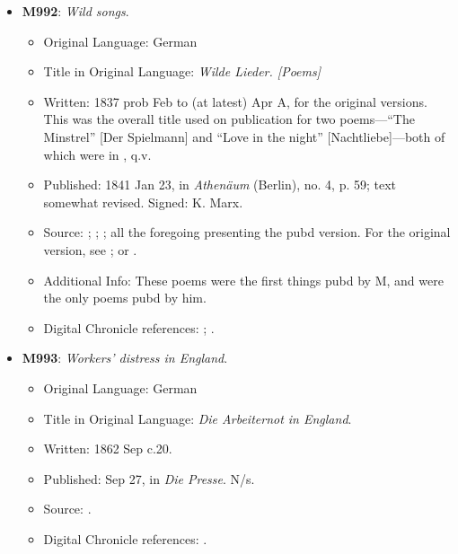 \begin{itemize}
    \item \textbf{M992}: \textit{Wild songs}.
    \begin{itemize}
        \item Original Language: German
        \item Title in Original Language: \textit{Wilde Lieder. [Poems]}
        \item Written: 1837 prob Feb to (at latest) Apr A, for the original versions. This was the overall title used on publication for two poems---``The Minstrel'' [Der Spielmann] and ``Love in the night'' [Nachtliebe]---both of which were in , q.v.
        \item Published: 1841 Jan 23, in \textit{Athenäum} (Berlin), no. 4, p. 59; text somewhat revised. Signed: K. Marx.
        \item Source: ; ; ; all the foregoing presenting the pubd version. For the original version, see ; or .
        \item Additional Info: These poems were the first things pubd by M, and were the only poems pubd by him.
        \item Digital Chronicle references: ; .
    \end{itemize}

    \item \textbf{M993}: \textit{Workers' distress in England}.
    \begin{itemize}
        \item Original Language: German
        \item Title in Original Language: \textit{Die Arbeiternot in England}.
        \item Written: 1862 Sep c.20.
        \item Published: Sep 27, in \textit{Die Presse}. N/s.
        \item Source: .
        \item Digital Chronicle references: .
    \end{itemize}


\end{itemize}

